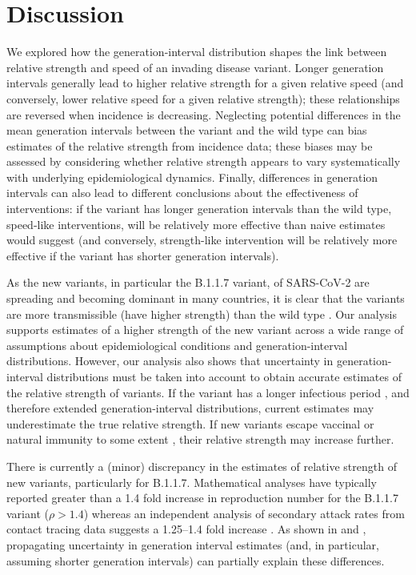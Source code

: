 \documentclass[12pt]{article}
\begin{document}
\section{Discussion}

We explored how the generation-interval distribution shapes the link between relative strength and speed of an invading disease variant.
Longer generation intervals generally lead to higher relative strength for a given relative speed (and conversely, lower relative speed for a given relative strength); these relationships are reversed when incidence is decreasing.
Neglecting potential differences in the mean generation intervals between the variant and the wild type can bias estimates of the relative strength from incidence data;
these biases may be assessed by considering whether relative strength appears to vary systematically with underlying epidemiological dynamics.
Finally, differences in generation intervals can also lead to different conclusions about the effectiveness of interventions:
if the variant has longer generation intervals than the wild type, speed-like interventions, will be relatively more effective than naive estimates would suggest (and conversely, strength-like intervention will be relatively more effective if the variant has shorter generation intervals).

As the new variants, in particular the B.1.1.7 variant, of SARS-CoV-2 are spreading and becoming dominant in many countries, it is clear that the variants are more transmissible (have higher strength) than the wild type \citep{switzerland2021variant, davies2021estimated, di2021impact, leung2021early, volz2021transmission,zhao2021}.
Our analysis supports estimates of a higher strength of the new variant across a wide range of assumptions about epidemiological conditions and generation-interval distributions.
However, our analysis also shows that uncertainty in generation-interval distributions must be taken into account to obtain accurate estimates of the relative strength of variants.
If the variant has a longer infectious period \citep{kissler2021densely}, and therefore extended generation-interval distributions, current estimates may underestimate the true relative strength.
If new variants escape vaccinal or natural immunity to some extent \citep{shaman2020will}, their relative strength may increase further.

There is currently a (minor) discrepancy in the estimates of relative strength of new variants, particularly for B.1.1.7.
Mathematical analyses have typically reported greater than a 1.4 fold increase in reproduction number for the B.1.1.7 variant ($\rho > 1.4$) whereas an independent analysis of secondary attack rates from contact tracing data suggests a 1.25--1.4 fold increase \citep{ukinvest}.
As shown in \cite{davies2021estimated} and \cite{volz2021transmission}, propagating uncertainty in generation interval estimates (and, in particular, assuming shorter generation intervals) can partially explain these differences.
\end{document}
